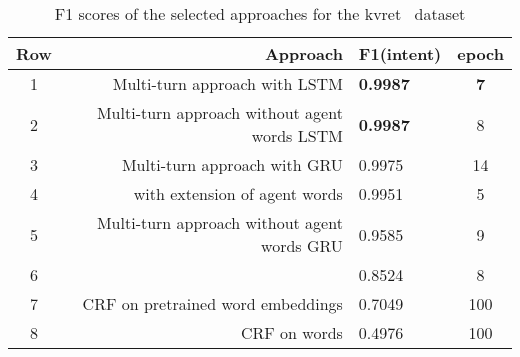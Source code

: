 
\begin{table}
  \begin{tabularx}{\textwidth}{crlc}
    \toprule
    Row & Approach & F1(intent) & epoch\\
    \midrule
    1 & Multi-turn approach with LSTM & \textbf{0.9987} & \textbf{7} \\ %
    2 & Multi-turn approach without agent words LSTM & \textbf{0.9987} & 8 \\ %
    3 & Multi-turn approach with GRU & 0.9975 & 14 \\ %
    4 & \cite{liu2016attention} with extension of agent words & 0.9951 & 5 \\ %
    5 & Multi-turn approach without agent words GRU & 0.9585 & 9 \\ %
    6 & \cite{liu2016attention} & 0.8524 & 8\\ %
    \midrule
    7 & CRF on pretrained word embeddings & 0.7049 & 100 \\ %
    8 & CRF on words & 0.4976 & 100 \\ %
    \bottomrule
  \end{tabularx}
  \caption{F1 scores of the selected approaches for the kvret~\cite{eric2017key} dataset}\label{tab:multiTurnScores}
\end{table}
